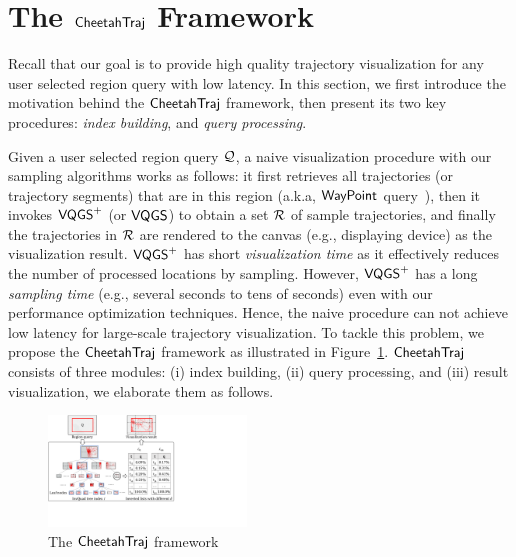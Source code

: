 \section{The $\mathsf{CheetahTraj}$ Framework}\label{sec:cheetahtraj}
Recall that our goal is to provide high quality trajectory visualization for any user selected region query with low latency.
In this section, we first introduce the motivation behind the $\mathsf{CheetahTraj}$ framework, then present its two key procedures: \textit{index building}, and \textit{query processing}.

Given a user selected region query $\mathcal{Q}$, a naive visualization procedure with our sampling algorithms works as follows:
it first retrieves all trajectories (or trajectory segments) that are in this region (a.k.a, $\mathsf{WayPoint}$ query~\cite{kruger2013trajectorylenses}),
then it invokes $\mathsf{VQGS}^+$ (or $\mathsf{VQGS}$) to obtain a set $\mathcal{R}$ of sample trajectories, and finally the trajectories in $\mathcal{R}$ are rendered to the canvas (e.g., displaying device) as the visualization result.
$\mathsf{VQGS}^+$ has short \textit{visualization time} as it effectively reduces the number of processed locations by sampling. However, $\mathsf{VQGS}^+$ has a long \textit{sampling time} (e.g., several seconds to tens of seconds) even with our performance optimization techniques.
Hence, the naive procedure can not achieve low latency for large-scale trajectory visualization. To tackle this problem, we propose the $\mathsf{CheetahTraj}$ framework as illustrated in Figure~\ref{fig:framework}.  $\mathsf{CheetahTraj}$ consists of three modules: (i) \textsf{index building}, (ii) \textsf{query processing}, and (iii) \textsf{result visualization}, we elaborate them as follows.



\begin{figure}
	\centering
	\includegraphics[width=0.47\textwidth]{pictures/cheetahtraj}
    \trim
    \caption{The $\mathsf{CheetahTraj}$ framework}
    \label{fig:framework}
    \trim
\end{figure}


